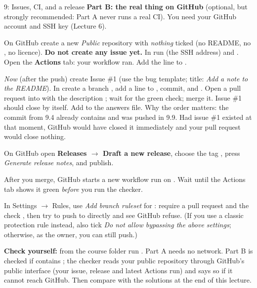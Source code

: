 \begin{homework}{9: Issues, CI, and a release}
\textbf{Part B: the real thing on GitHub} (optional, but strongly recommended: Part A never runs a real CI). You need your GitHub account and SSH key (Lecture 6).
\begin{description}[leftmargin=1.2em,style=nextline]
\item[9.9 Publish and watch CI] On GitHub create a new \emph{Public} repository  with \emph{nothing} ticked (no README, no , no licence). \textbf{Do not create any issue yet.} In  run  (the SSH address) and . Open the \textbf{Actions} tab: your workflow ran. Add the line  to .
\item[9.10 Issue to pull request to closed issue] \emph{Now} (after the push) create Issue \#1 (use the bug template; title: \emph{Add a note to the README}). In  create a branch , add a line to , commit, and . Open a pull request into  with the description ; wait for the green check; merge it. Issue \#1 should close by itself. Add  to the answers file. Why the order matters: the commit from 9.4 already contains  and was pushed in 9.9. Had issue \#1 existed at that moment, GitHub would have closed it immediately and your pull request would close nothing.
\item[9.11 Release] On GitHub open \textbf{Releases $\rightarrow$ Draft a new release}, choose the tag , press \emph{Generate release notes}, and publish.
\item[9.12 Wait for green] After you merge, GitHub starts a new workflow run on . Wait until the Actions tab shows it green \emph{before} you run the checker.
\item[9.13 Explore (not checked)] In Settings $\rightarrow$ Rules, use \emph{Add branch ruleset} for : require a pull request and the check , then try to push to  directly and see GitHub refuse. (If you use a classic protection rule instead, also tick \emph{Do not allow bypassing the above settings}; otherwise, as the owner, you can still push.)
\end{description}

\textbf{Check yourself:} from the course folder run . Part A needs no network. Part B is checked if  contains ; the checker reads your public repository through GitHub's public interface (your issue, release and latest Actions run) and says so if it cannot reach GitHub. Then compare with the solutions at the end of this lecture.
\end{homework}

